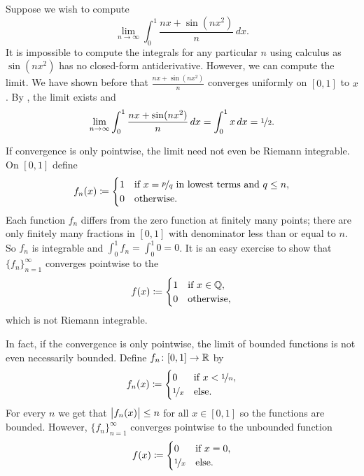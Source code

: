 \begin{example}
Suppose we wish to compute
\begin{equation*}
\lim_{n\to\infty} \int_0^1 \frac{nx+ \sin(nx^2)}{n} \,dx .
\end{equation*}
It is impossible to compute the integrals for any particular $n$ using 
calculus as $\sin(nx^2)$ has no closed-form antiderivative.  However,
we can compute the limit.
We have shown before that $\frac{nx+ \sin(nx^2)}{n}$ converges uniformly
on $[0,1]$ to $x$.
By , the limit exists and
\begin{equation*}
\lim_{n\to\infty} \int_0^1 \frac{nx+ \sin(nx^2)}{n} \,dx
=
\int_0^1
x \,dx = \nicefrac{1}{2} .
\end{equation*}
\end{example}

\begin{example}
If convergence is only pointwise, the limit need not even be Riemann
integrable.  On $[0,1]$ define
\begin{equation*}
f_n(x) \coloneqq
\begin{cases}
1 & \text{if } x = \nicefrac{p}{q} \text{ in lowest terms and } q \leq n, \\
0 & \text{otherwise.}
\end{cases}
\end{equation*}
Each function $f_n$ differs from the zero function at finitely many points;
there are only finitely many fractions in $[0,1]$ with denominator less than
or equal to $n$.   So $f_n$ is integrable and $\int_0^1 f_n = \int_0^1 0 =
0$.  It is an easy exercise to show that $\{ f_n \}_{n=1}^\infty$ converges pointwise to the
\begin{equation*}
f(x) \coloneqq
\begin{cases}
1 & \text{if } x \in {\mathbb{Q}}, \\
0 & \text{otherwise,}
\end{cases}
\end{equation*}
which is not Riemann integrable.
\end{example}

\begin{example}
In fact, if the convergence is only pointwise, the limit of bounded
functions is not even necessarily bounded.
Define $f_n \colon [0,1] \to {\mathbb{R}}$ by
\begin{equation*}
f_n(x) \coloneqq
\begin{cases}
0 & \text{if } x < \nicefrac{1}{n},\\
\nicefrac{1}{x} & \text{else.}
\end{cases}
\end{equation*}
For every $n$ we get that $\bigl\lvert {f_n(x)} \bigr\rvert \leq n$ for all $x \in [0,1]$ so the
functions are bounded.  However, $\{ f_n \}_{n=1}^\infty$ converges pointwise to
the unbounded function
\begin{equation*}
f(x) \coloneqq
\begin{cases}
0 & \text{if } x = 0,\\
\nicefrac{1}{x} & \text{else.}
\end{cases}
\end{equation*}
\end{example}

